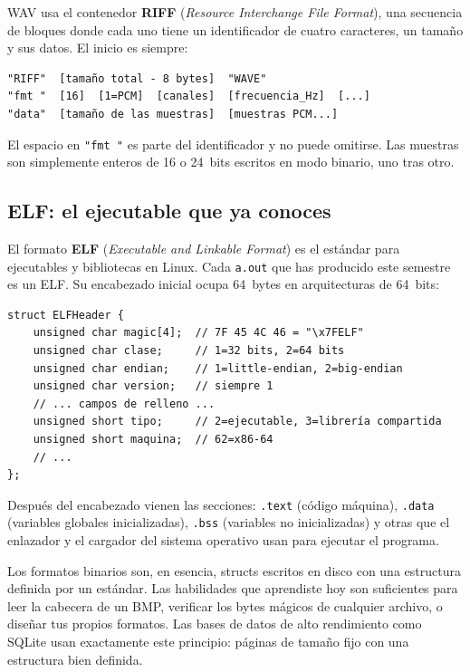 \documentclass[12pt, oneside]{article}
\begin{document}
WAV usa el contenedor \textbf{RIFF} (\textit{Resource Interchange File
Format}), una secuencia de bloques donde cada uno tiene un identificador
de cuatro caracteres, un tamaño y sus datos.  El inicio es siempre:

\begin{verbatim}
"RIFF"  [tamaño total - 8 bytes]  "WAVE"
"fmt "  [16]  [1=PCM]  [canales]  [frecuencia_Hz]  [...]
"data"  [tamaño de las muestras]  [muestras PCM...]
\end{verbatim}

El espacio en \texttt{"fmt "} es parte del identificador y no puede
omitirse.  Las muestras son simplemente enteros de 16 o 24~bits escritos
en modo binario, uno tras otro.

\subsection{ELF: el ejecutable que ya conoces}

El formato \textbf{ELF} (\textit{Executable and Linkable Format}) es el
estándar para ejecutables y bibliotecas en Linux.  Cada \texttt{a.out}
que has producido este semestre es un ELF.  Su encabezado inicial ocupa
64~bytes en arquitecturas de 64~bits:

\begin{verbatim}
struct ELFHeader {
    unsigned char magic[4];  // 7F 45 4C 46 = "\x7FELF"
    unsigned char clase;     // 1=32 bits, 2=64 bits
    unsigned char endian;    // 1=little-endian, 2=big-endian
    unsigned char version;   // siempre 1
    // ... campos de relleno ...
    unsigned short tipo;     // 2=ejecutable, 3=librería compartida
    unsigned short maquina;  // 62=x86-64
    // ...
};
\end{verbatim}

Después del encabezado vienen las secciones: \texttt{.text} (código
máquina), \texttt{.data} (variables globales inicializadas), \texttt{.bss}
(variables no inicializadas) y otras que el enlazador y el cargador del
sistema operativo usan para ejecutar el programa.

\begin{consejo}
  Los formatos binarios son, en esencia, structs escritos en disco con
  una estructura definida por un estándar.  Las habilidades que aprendiste
  hoy son suficientes para leer la cabecera de un BMP, verificar los bytes
  mágicos de cualquier archivo, o diseñar tus propios formatos.  Las bases
  de datos de alto rendimiento como SQLite usan exactamente este principio:
  páginas de tamaño fijo con una estructura bien definida.
\end{consejo}
\end{document}
